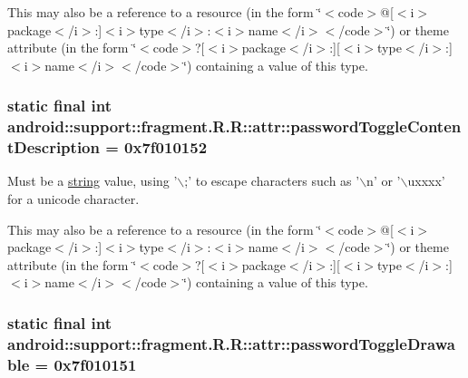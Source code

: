 This may also be a reference to a resource (in the form \char`\"{}$<$code$>$@\mbox{[}$<$i$>$package$<$/i$>$:\mbox{]}$<$i$>$type$<$/i$>$:$<$i$>$name$<$/i$>$$<$/code$>$\char`\"{}) or theme attribute (in the form \char`\"{}$<$code$>$?\mbox{[}$<$i$>$package$<$/i$>$:\mbox{]}\mbox{[}$<$i$>$type$<$/i$>$:\mbox{]}$<$i$>$name$<$/i$>$$<$/code$>$\char`\"{}) containing a value of this type. \hypertarget{classandroid_1_1support_1_1fragment_1_1_r_1_1attr_fc8a17456fdf8ffb02a8e70af3d64af8}{
\subsubsection[{passwordToggleContentDescription}]{\setlength{\rightskip}{0pt plus 5cm}static final int android::support::fragment.R.R::attr::passwordToggleContentDescription = 0x7f010152}}
\label{classandroid_1_1support_1_1fragment_1_1_r_1_1attr_fc8a17456fdf8ffb02a8e70af3d64af8}


Must be a \hyperlink{classandroid_1_1support_1_1fragment_1_1_r_1_1string}{string} value, using '$\backslash$;' to escape characters such as '$\backslash$n' or '$\backslash$uxxxx' for a unicode character. 

This may also be a reference to a resource (in the form \char`\"{}$<$code$>$@\mbox{[}$<$i$>$package$<$/i$>$:\mbox{]}$<$i$>$type$<$/i$>$:$<$i$>$name$<$/i$>$$<$/code$>$\char`\"{}) or theme attribute (in the form \char`\"{}$<$code$>$?\mbox{[}$<$i$>$package$<$/i$>$:\mbox{]}\mbox{[}$<$i$>$type$<$/i$>$:\mbox{]}$<$i$>$name$<$/i$>$$<$/code$>$\char`\"{}) containing a value of this type. \hypertarget{classandroid_1_1support_1_1fragment_1_1_r_1_1attr_cffcaefef79cb742ba7fc46a485f73ab}{
\subsubsection[{passwordToggleDrawable}]{\setlength{\rightskip}{0pt plus 5cm}static final int android::support::fragment.R.R::attr::passwordToggleDrawable = 0x7f010151}}
\label{classandroid_1_1support_1_1fragment_1_1_r_1_1attr_cffcaefef79cb742ba7fc46a485f73ab}


